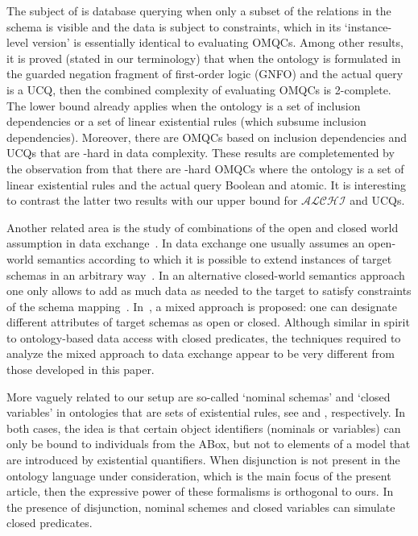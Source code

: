 \documentclass{lmcs}
\theoremstyle{definition}
\begin{document}
The subject of \cite{DBLP:conf/lics/BenediktBCP16} is database
querying when only a subset of the relations in the schema is visible
and the data is subject to constraints, which in its `instance-level
version' is essentially identical to evaluating OMQCs. Among other
results, it is proved (stated in our terminology) that when the
ontology is formulated in the guarded negation fragment of first-order
logic (GNFO) and the actual query is a UCQ, then the combined
complexity of evaluating OMQCs is 2\ExpTime-complete. The lower bound
already applies when the ontology is a set of inclusion dependencies
or a set of linear existential rules (which subsume inclusion
dependencies). Moreover, there are OMQCs based on inclusion
dependencies and UCQs that are \ExpTime-hard in data complexity. These
results are completemented by the observation from \cite{Benedikt}
that there are \PSpace-hard OMQCs where the ontology is a set of linear existential rules and 
the actual query Boolean and atomic. It is interesting to contrast the latter two 
results with our \conp upper bound for $\mathcal{ALCHI}$ and UCQs.

Another related area is the study of combinations of the
open and closed world assumption in data exchange~\cite{DBLP:journals/jcss/LibkinS11}.
In data exchange one usually assumes an open-world semantics according to
which it is possible to extend instances of target schemas in an arbitrary way~\cite{DBLP:books/cu/ArenasBLM2014}. 
In an alternative closed-world semantics approach one only allows to add as much data as needed to the 
target to satisfy constraints of the schema mapping~\cite{DBLP:journals/tods/HernichLS11}. 
In~\cite{DBLP:journals/jcss/LibkinS11}, a mixed
approach is proposed: one can designate different attributes of target schemas as open or closed.
Although similar in spirit to ontology-based data access with closed predicates, 
the techniques required to analyze the mixed approach to data exchange appear
to be very different from those developed in this paper.

More vaguely related to our setup are so-called `nominal schemas' and
`closed variables' in ontologies that are sets of existential rules,
see \cite{DBLP:conf/www/KrotzschMKH11,DBLP:conf/kr/KrotzschR14} and
\cite{DBLP:conf/ijcai/AmendolaLMV18}, respectively. In both cases, the
idea is that certain object identifiers (nominals or variables) can
only be bound to individuals from the ABox, but not to elements of a
model that are introduced by existential quantifiers. When disjunction
is not present in the ontology language under consideration, which is
the main focus of the present article, then the expressive power of
these formalisms is orthogonal to ours. In the presence of
disjunction, nominal schemes and closed variables can simulate closed
predicates.
\end{document}
